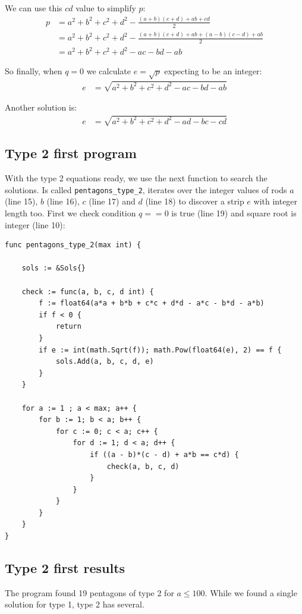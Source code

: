 \documentclass[11pt]{article}
\begin{document}
We can use this $cd$ value to simplify $p$:
\begin{align*}
p &= a^2+b^2+c^2+d^2 - \frac{(a+b)(c+d)+ab+cd}{2}\\
  &= a^2+b^2+c^2+d^2 - \frac{(a+b)(c+d)+ab+(a-b)(c-d)+ab}{2}\\
  &= a^2+b^2+c^2+d^2 -ac -bd -ab
\end{align*}

So finally, when $q=0$ we calculate $e = \sqrt{p}$ expecting to be an integer:
\begin{align*}
e &= \sqrt{a^2 + b^2 + c^2 + d^2 -ac -bd - ab}
\end{align*}

Another solution is:
\begin{align*}
e &= \sqrt{a^2 + b^2 + c^2 + d^2 -ad -bc - cd}
\end{align*}


\subsection{Type 2 first program}

With the type 2 equations ready, we use the next function to search the solutions.
Is called \texttt{pentagons\_type\_2}, iterates over the integer values of rods 
$a$ (line 15), $b$ (line 16), $c$ (line 17) and $d$ (line 18)
to discover a strip $e$ with integer length too. First we check condition $q == 0$ is
true (line 19) and square root is integer (line 10):
\begin{lstlisting}
func pentagons_type_2(max int) {

	sols := &Sols{}

	check := func(a, b, c, d int) {
		f := float64(a*a + b*b + c*c + d*d - a*c - b*d - a*b)
	    if f < 0 {
	    	return
	    }
		if e := int(math.Sqrt(f)); math.Pow(float64(e), 2) == f {
			sols.Add(a, b, c, d, e)
		}
	}

    for a := 1 ; a < max; a++ {
    	for b := 1; b < a; b++ {
        	for c := 0; c < a; c++ {
          		for d := 1; d < a; d++ {
            		if ((a - b)*(c - d) + a*b == c*d) {
              			check(a, b, c, d)
              		}
              	}
            }
        }
    }
}
\end{lstlisting}

\subsection{Type 2 first results}
The program found 19 pentagons of type 2 for $a \leq 100$.
While we found a single solution for type 1, type 2 has several.
\end{document}
